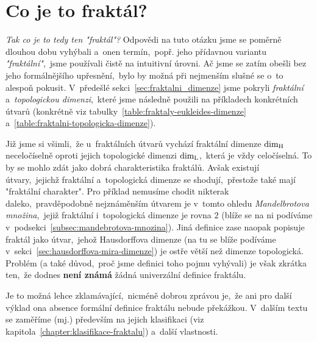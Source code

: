 \section{Co je to fraktál?}\label{sec:co-je-to-fraktal}
\emph{Tak co je to tedy ten "fraktál"?} Odpovědi na tuto otázku jsme se poměrně dlouhou dobu vyhýbali a~onen termín,~popř. jeho přídavnou variantu \emph{"fraktální"},~jsme používali čistě na intuitivní úrovni. Ač jsme se zatím obešli bez jeho formálnějšího upřesnění,~bylo by možná při nejmenším slušné se o~to alespoň pokusit. V~předešlé sekci~\ref{sec:fraktalni_dimenze} jsme pokryli \emph{fraktální} a~\emph{topologickou dimenzi},~které jsme následně použili na příkladech konkrétních útvarů (konkrétně viz tabulky~\ref{table:fraktaly-eukleides-dimenze} a~\ref{table:fraktalni-topologicka-dimenze}).

Již jsme si všimli,~že u~fraktálních útvarů vychází fraktální dimenze $\operatorname{dim_H}$ neceločíselně oproti jejich topologické dimenzi $\operatorname{dim_L}$,~která je vždy celočíselná. To by se mohlo zdát jako dobrá charakteristika fraktálů. Avšak existují útvary,~jejichž fraktální a~topologická dimenze se shodují,~přestože také mají "fraktální charakter". Pro příklad nemusíme chodit nikterak daleko,~pravděpodobně nejznáměnším útvarem je v~tomto ohledu \emph{Mandelbrotova množina},~jejiž fraktální i~topologická dimenze je rovna $2$ (blíže se na ni podíváme v~podsekci~\ref{subsec:mandebrotova-mnozina}). Jiná definice zase naopak popisuje fraktál jako útvar,~jehož Hausdorffova dimenze (na tu se blíže podíváme v~sekci~\ref{sec:hausdorffova-mira-dimenze}) je ostře větší než dimenze topologická. Problém (a také důvod,~proč jsme definici toho pojmu vyhývali) je však zkrátka ten,~že dodnes \textbf{není známá} žádná univerzální definice fraktálu. \cite[str. 226]{Voracova2022}

Je to možná lehce zklamávající,~nicméně dobrou zprávou je,~že ani pro další výklad ona absence formální definice fraktálu nebude překážkou. V~dalším textu se zaměříme (mj.) především na jejich klasifikaci (viz kapitola~\ref{chapter:klasifikace-fraktalu}) a~další vlastnosti.